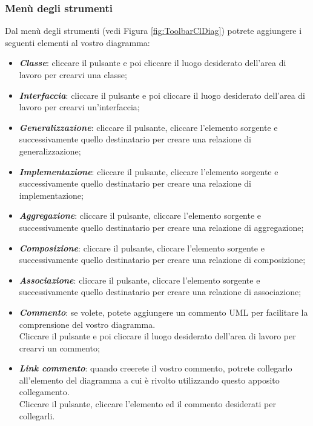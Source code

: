 \documentclass[../ManualeUtente.tex]{subfiles}
\begin{document}
			\subsubsection{Menù degli strumenti}
				Dal menù degli strumenti (vedi Figura \ref{fig:ToolbarClDiag}) potrete aggiungere i seguenti elementi
				al vostro diagramma:
				\begin{itemize}
					\item \textit{\textbf{Classe}}: cliccare il pulsante e poi cliccare il luogo desiderato
					dell'area di lavoro per crearvi una classe;
					\item \textit{\textbf{Interfaccia}}: cliccare il pulsante e poi cliccare il luogo desiderato
					dell'area di lavoro per crearvi un'interfaccia;
					\item \textit{\textbf{Generalizzazione}}: cliccare il pulsante, cliccare l'elemento sorgente
					e successivamente quello destinatario per creare una relazione di generalizzazione;
					\item \textit{\textbf{Implementazione}}: cliccare il pulsante, cliccare l'elemento sorgente
					e successivamente quello destinatario per creare una relazione di implementazione;
					\item \textit{\textbf{Aggregazione}}: cliccare il pulsante, cliccare l'elemento sorgente
					e successivamente quello destinatario per creare una relazione di aggregazione;
					\item \textit{\textbf{Composizione}}: cliccare il pulsante, cliccare l'elemento sorgente
					e successivamente quello destinatario per creare una relazione di composizione;
					\item \textit{\textbf{Associazione}}: cliccare il pulsante, cliccare l'elemento sorgente
					e successivamente quello destinatario per creare una relazione di associazione;
					\item \textit{\textbf{Commento}}: se volete, potete aggiungere un commento UML per facilitare la
					comprensione del vostro diagramma.\\
					Cliccare il pulsante e poi cliccare il luogo desiderato
					dell'area di lavoro per crearvi un commento;
					\item \textit{\textbf{Link commento}}: quando creerete il vostro commento, potrete collegarlo
					all'elemento del diagramma a cui è rivolto utilizzando questo apposito collegamento.\\
					Cliccare il pulsante, cliccare l'elemento ed il
					commento desiderati per collegarli.
				\end{itemize}
\end{document}
